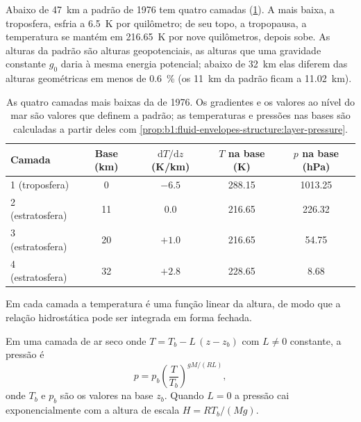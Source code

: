 Abaixo de \qty{47}{km} a padrão de 1976 tem quatro camadas
(\cref{tab:b1:fluid-envelopes-structure:layers}). A mais baixa, a troposfera, esfria a
\qty{6.5}{K} por quilômetro; de seu topo, a tropopausa, a temperatura se mantém em
\qty{216.65}{K} por nove quilômetros, depois sobe. As alturas da padrão são alturas
geopotenciais, as alturas que uma gravidade constante $g_0$ daria à mesma energia potencial;
abaixo de \qty{32}{km} elas diferem das alturas geométricas em menos de \qty{0.6}{\percent} (os
\qty{11}{km} da padrão ficam a \qty{11.02}{km}).

\begin{table}[ht]
\centering
\small
\renewcommand{\arraystretch}{1.2}
\begin{tabular}{|l|c|c|c|c|}
\hline
Camada & Base (km) & $\mathrm dT/\mathrm dz$ (K/km) & $T$ na base (K) & $p$ na base (hPa) \\
\hline
1 (troposfera) & 0 & $-6.5$ & 288.15 & 1013.25 \\
2 (estratosfera) & 11 & 0.0 & 216.65 & 226.32 \\
3 (estratosfera) & 20 & $+1.0$ & 216.65 & 54.75 \\
4 (estratosfera) & 32 & $+2.8$ & 228.65 & 8.68 \\
\hline
\end{tabular}
\caption{As quatro camadas mais baixas da  de 1976. Os gradientes e os valores
ao nível do mar são valores que definem a padrão; as temperaturas e pressões nas bases são
calculadas a partir deles com \cref{prop:b1:fluid-envelopes-structure:layer-pressure}.}
\label{tab:b1:fluid-envelopes-structure:layers}
\end{table}

Em cada camada a temperatura é uma função linear da altura, de modo que a relação hidrostática
pode ser integrada em forma fechada.

\begin{proposition}\label{prop:b1:fluid-envelopes-structure:layer-pressure}
Em uma camada de ar seco onde $T = T_b - L\,(z - z_b)$ com $L \neq 0$ constante, a pressão é
\[
  p = p_b \left(\frac{T}{T_b}\right)^{gM/(RL)},
\]
onde $T_b$ e $p_b$ são os valores na base $z_b$. Quando $L = 0$ a pressão cai exponencialmente
com a altura de escala $H = RT_b/(Mg)$.
\end{proposition}

